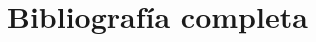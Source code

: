 \documentclass[letterpaper,12pt]{article}
\begin{document}
\section*{Bibliografía completa}

\printbibliography
\end{document}
